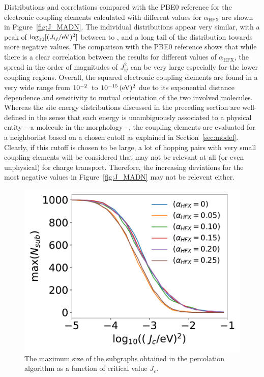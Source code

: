 \documentclass[%
 reprint,
superscriptaddress,
 amsmath,amssymb,
 aps,
prb,
floatfix
]{revtex4-2}
\newcommand{\ahfx}{\ensuremath{\alpha_\text{HFX}}\xspace}
\begin{document}
Distributions and correlations compared with the PBE0 reference for the electronic coupling elements calculated with different values for \ahfx are shown in Figure~\ref{fig:J_MADN}. The individual distributions appear very similar, with a peak of $\log_{10}[(J_{ij}/\unit[]{eV})^2]$ between \unit[-5]{} to \unit[-6]{}, and a long tail of the distribution towards more negative values. The comparison with the PBE0 reference shows that while there is a clear correlation between the results for different values of \ahfx, the spread in the order of magnitudes of $J_{ij}^2$ can be very large especially for the lower coupling regions. Overall, the squared electronic coupling elements are found in a very wide range from $\unit[10^{-2}]{}$ to $\unit[10^{-15}]{(eV)^2}$ due to its exponential distance dependence and sensitivity to mutual orientation of the two involved molecules. Whereas the site energy distributions discussed in the preceding section are well-defined in the sense that each energy is unambiguously associated to a physical entity -- a molecule in the morphology --, the coupling elements are evaluated for a neighborlist based on a chosen cutoff as explained in Section~\ref{sec:model}. Clearly, if this cutoff is chosen to be large, a lot of hopping pairs with very small coupling elements will be considered that may not be relevant at all (or even unphysical) for charge transport. Therefore, the increasing deviations for the most negative values in Figure~\ref{fig:J_MADN} may not be relevent either. 

\begin{figure}[tbp]
  \centering
  \includegraphics[width=\linewidth]{fig5.pdf}
  \caption{The maximum size of the subgraphs obtained in the percolation algorithm as a function of critical value $J_c$.}
  \label{fig:J_percolate}
\end{figure}
\end{document}

